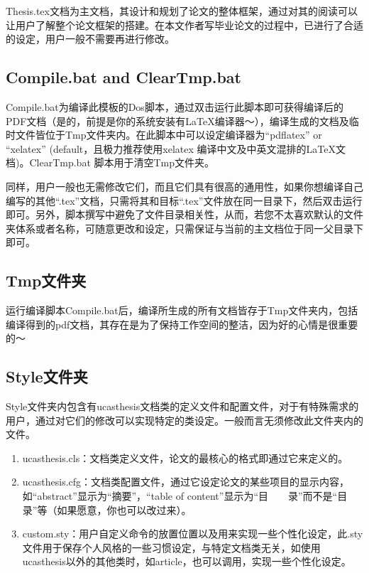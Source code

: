 Thesis.tex文档为主文档，其设计和规划了论文的整体框架，通过对其的阅读可以让用户了解整个论文框架的搭建。在本文作者写毕业论文的过程中，已进行了合适的设定，用户一般不需要再进行修改。

\subsection{Compile.bat and Clear\textunderscore Tmp.bat}

Compile.bat为编译此模板的Dos脚本，通过双击运行此脚本即可获得编译后的PDF文档（是的，前提是你的系统安装有\LaTeX{}编译器～），编译生成的文档及临时文件皆位于Tmp文件夹内。在此脚本中可以设定编译器为“pdflatex” or “xelatex” (default，且极力推荐使用xelatex 编译中文及中英文混排的\LaTeX{}文档)。Clear\textunderscore Tmp.bat 脚本用于清空Tmp文件夹。

同样，用户一般也无需修改它们，而且它们具有很高的通用性，如果你想编译自己编写的其他“.tex”文档，只需将其和目标“.tex”文件放在同一目录下，然后双击运行即可。另外，脚本撰写中避免了文件目录相关性，从而，若您不太喜欢默认的文件夹体系或者名称，可随意更改和设定，只需保证与当前的主文档位于同一父目录下即可。

\subsection{Tmp文件夹}

运行编译脚本Compile.bat后，编译所生成的所有文档皆存于Tmp文件夹内，包括编译得到的pdf文档，其存在是为了保持工作空间的整洁，因为好的心情是很重要的～

\subsection{Style文件夹}

Style文件夹内包含有ucasthesis文档类的定义文件和配置文件，对于有特殊需求的用户，通过对它们的修改可以实现特定的类设定。一般而言无须修改此文件夹内的文件。

\begin{enumerate}
  \item ucasthesis.cls：文档类定义文件，论文的最核心的格式即通过它来定义的。
  \item ucasthesis.cfg：文档类配置文件，通过它设定论文的某些项目的显示内容，如“abstract”显示为“摘要”，“table of content”显示为“目~~~~录”而不是“目录”等（如果愿意，你也可以改过来）。
  \item custom.sty：用户自定义命令的放置位置以及用来实现一些个性化设定，此.sty文件用于保存个人风格的一些习惯设定，与特定文档类无关，如使用ucasthesis以外的其他类时，如article，也可以调用，实现一些个性化设定。
\end{enumerate}

